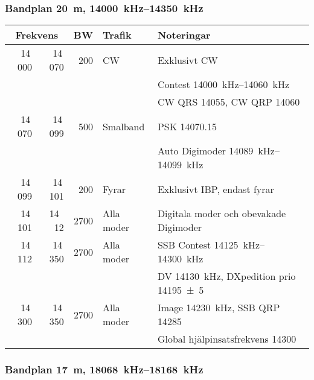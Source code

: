 \subsubsection{Bandplan \SI{20}{\metre}, \SIrange{14000}{14350}{\kilo\hertz}}
\begin{tabular}{rrrll}
\multicolumn{2}{c}{\textbf{Frekvens}} & \textbf{BW} & \textbf{Trafik}
        & \textbf{Noteringar} \\ \hline

14\,000 & 14\,070 & 200  & CW         & Exklusivt CW                                        \\
        &         &      &            & Contest \SIrange{14000}{14060}{\kilo\hertz}                 \\
        &         &      &            & CW QRS \num{14055}, CW QRP \num{14060}              \\ \hline
14\,070 & 14\,099 & 500  & Smalband   & PSK \num{14070,15}                                  \\
        &         &      &            & Auto Digimoder \SIrange{14089}{14099}{\kilo\hertz}          \\ \hline
14\,099 & 14\,101 & 200  & Fyrar      & Exklusivt IBP, endast fyrar                         \\ \hline
14\,101 & 14 \,12 & 2700 & Alla moder & Digitala moder och obevakade Digimoder              \\ \hline
14\,112 & 14\,350 & 2700 & Alla moder & SSB Contest \SIrange{14125}{14300}{\kilo\hertz}             \\
        &         &      &            & DV \SI{14130}{\kilo\hertz}, DXpedition prio \SI{14195(5)}{} \\ \hline
14\,300 & 14\,350 & 2700 & Alla moder & Image \SI{14230}{\kilo\hertz}, SSB QRP \num{14285}          \\
        &         &      &            & Global hjälpinsatsfrekvens \num{14300}              \\ \hline
\end{tabular}

\subsubsection{Bandplan \SI{17}{\metre}, \SIrange{18068}{18168}{\kilo\hertz}}


